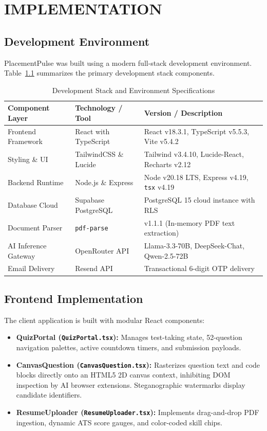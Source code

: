 \chapter{IMPLEMENTATION}

\section{Development Environment}
PlacementPulse was built using a modern full-stack development environment. Table~\ref{tab:dev_environment} summarizes the primary development stack components.

\begin{table}[htbp]
\centering
\footnotesize
\caption{Development Stack and Environment Specifications}
\label{tab:dev_environment}
\begin{tabularx}{\textwidth}{l p{3.8cm} X}
\toprule
\textbf{Component Layer} & \textbf{Technology / Tool} & \textbf{Version / Description} \\
\midrule
Frontend Framework & React with TypeScript & React v18.3.1, TypeScript v5.5.3, Vite v5.4.2 \\
Styling \& UI & TailwindCSS \& Lucide & Tailwind v3.4.10, Lucide-React, Recharts v2.12 \\
Backend Runtime & Node.js \& Express & Node v20.18 LTS, Express v4.19, \texttt{tsx} v4.19 \\
Database Cloud & Supabase PostgreSQL & PostgreSQL 15 cloud instance with RLS \\
Document Parser & \texttt{pdf-parse} & v1.1.1 (In-memory PDF text extraction) \\
AI Inference Gateway & OpenRouter API & Llama-3.3-70B, DeepSeek-Chat, Qwen-2.5-72B \\
Email Delivery & Resend API & Transactional 6-digit OTP delivery \\
\bottomrule
\end{tabularx}
\end{table}

\section{Frontend Implementation}
The client application is built with modular React components:
\begin{itemize}
    \item \textbf{QuizPortal (\texttt{QuizPortal.tsx}):} Manages test-taking state, 52-question navigation palettes, active countdown timers, and submission payloads.
    \item \textbf{CanvasQuestion (\texttt{CanvasQuestion.tsx}):} Rasterizes question text and code blocks directly onto an HTML5 2D canvas context, inhibiting DOM inspection by AI browser extensions. Steganographic watermarks display candidate identifiers.
    \item \textbf{ResumeUploader (\texttt{ResumeUploader.tsx}):} Implements drag-and-drop PDF ingestion, dynamic ATS score gauges, and color-coded skill chips.
\end{itemize}

